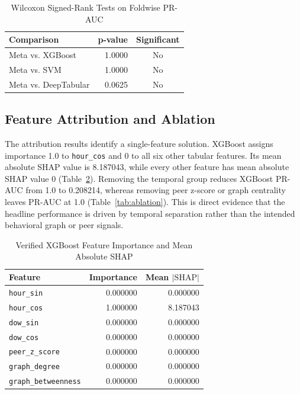 \documentclass[journal]{IEEEtran}
\begin{document}
\begin{table}[!htbp]
\caption{Wilcoxon Signed-Rank Tests on Foldwise PR-AUC}
\label{tab:significance}
\centering
\begin{tabular}{lrc}
\toprule
Comparison & p-value & Significant \\
\midrule
Meta vs. XGBoost & 1.0000 & No \\
Meta vs. SVM & 1.0000 & No \\
Meta vs. DeepTabular & 0.0625 & No \\
\bottomrule
\end{tabular}
\end{table}

\subsection{Feature Attribution and Ablation}
The attribution results identify a single-feature solution. XGBoost assigns importance 1.0 to \texttt{hour\_cos} and 0 to all six other tabular features. Its mean absolute SHAP value is 8.187043, while every other feature has mean absolute SHAP value 0 (Table~\ref{tab:attribution}). Removing the temporal group reduces XGBoost PR-AUC from 1.0 to 0.208214, whereas removing peer z-score or graph centrality leaves PR-AUC at 1.0 (Table~\ref{tab:ablation}). This is direct evidence that the headline performance is driven by temporal separation rather than the intended behavioral graph or peer signals.

\begin{table}[!htbp]
\caption{Verified XGBoost Feature Importance and Mean Absolute SHAP}
\label{tab:attribution}
\centering
\begin{tabular}{lrr}
\toprule
Feature & Importance & Mean $|\mathrm{SHAP}|$ \\
\midrule
\texttt{hour\_sin} & 0.000000 & 0.000000 \\
\texttt{hour\_cos} & 1.000000 & 8.187043 \\
\texttt{dow\_sin} & 0.000000 & 0.000000 \\
\texttt{dow\_cos} & 0.000000 & 0.000000 \\
\texttt{peer\_z\_score} & 0.000000 & 0.000000 \\
\texttt{graph\_degree} & 0.000000 & 0.000000 \\
\texttt{graph\_betweenness} & 0.000000 & 0.000000 \\
\bottomrule
\end{tabular}
\end{table}
\end{document}
